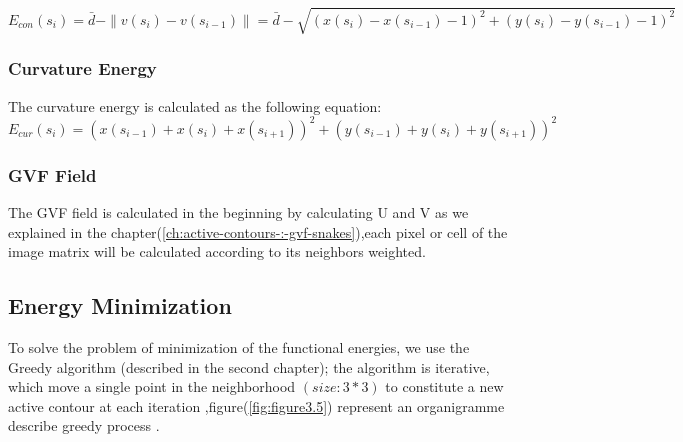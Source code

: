 \begin{equation}
    E_{con}(s_i) = \bar{d} - \| v(s_i) - v(s_{i-1}) \| = \bar{d} - \sqrt{(x(s_i) - x(s_{i-1}) - 1)^2 + (y(s_i) - y(s_{i-1}) - 1)^2}
    \label{eq:eq3.2}
\end{equation}

\subsubsection{Curvature Energy}
The curvature energy is calculated as the following equation:
\begin{equation}
    E_{cur}(s_i) = ( x(s_{i-1}) + x(s_i) + x(s_{i+1}) )^2 + ( y(s_{i-1}) + y(s_i) + y(s_{i+1}) )^2
    \label{eq:eq3.3}
\end{equation}

\subsubsection{GVF Field}
The GVF field is calculated in the beginning by calculating U and V as we explained in
the chapter(\ref{ch:active-contours-:-gvf-snakes}),each pixel or cell of the image matrix
will be calculated according to its neighbors weighted.

\subsection{Energy Minimization}\label{subsec:energy-minimization}
To solve the problem of minimization of the functional energies, we use the Greedy
algorithm (described in the second chapter); the algorithm is iterative, which move a
single point in the neighborhood $(size :3*3)$ to constitute a new active contour at
each iteration ,figure(\ref{fig:figure3.5}) represent an organigramme describe greedy process .

